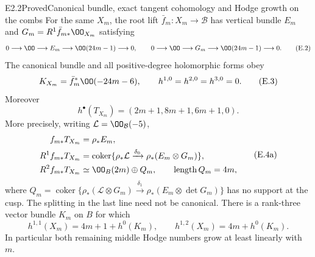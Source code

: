 \begin{claim}{E2.2}{Proved}{Canonical bundle, exact tangent cohomology and Hodge growth on the combs}
For the same $X_m$, the root lift $\bar f_m:X_m\to\mathcal B$ has
vertical bundle $E_m$ and $G_m=R^1\bar f_{m*}\OO_{X_m}$ satisfying
\[
 0\longrightarrow\OO\longrightarrow E_m
       \longrightarrow\OO(24m-1)\longrightarrow0,
 \qquad
 0\longrightarrow\OO\longrightarrow G_m
       \longrightarrow\OO(24m-1)\longrightarrow0.      \tag{E.2}
\]
The canonical bundle and all positive-degree holomorphic forms obey
\[
 K_{X_m}=\bar f_m^*\OO(-24m-6),\qquad
 h^{1,0}=h^{2,0}=h^{3,0}=0.                            \tag{E.3}
\]
Moreover
\[
 \boxed{h^\bullet(T_{X_m})=(2m+1,8m+1,6m+1,0).}       \tag{E.4}
\]
More precisely, writing $\mathcal L=\OO_{\mathcal B}(-5)$,
\[
 \begin{split}
 f_{m*}T_{X_m}&=\rho_*E_m,\\
 R^1f_{m*}T_{X_m}&=
  \operatorname{coker}\{\rho_*\mathcal L\xrightarrow{\delta_0}
                                      \rho_*(E_m\otimes G_m)\},\\
 R^2f_{m*}T_{X_m}&\simeq\OO_B(2m)\oplus Q_m,
 \qquad\operatorname{length}Q_m=4m,
 \end{split}                                        \tag{E.4a}
\]
where $Q_m=\operatorname{coker}\{\rho_*(\mathcal L\otimes G_m)
\xrightarrow{\delta_1}\rho_*(E_m\otimes\det G_m)\}$ has no support
at the cusp. The splitting in the last line need not be canonical.
There is a rank-three vector bundle $K_m$ on $B$ for which
\[
 \boxed{h^{1,1}(X_m)=4m+1+h^0(K_m),\qquad
 h^{1,2}(X_m)=4m+h^0(K_m).}                            \tag{E.5}
\]
In particular both remaining middle Hodge numbers grow at least
linearly with $m$.
\end{claim}
